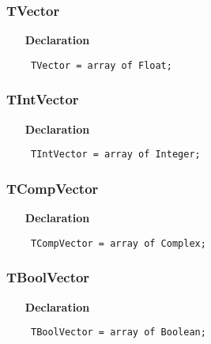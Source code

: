 \documentclass[12pt,a4paper,oneside]{report}
\newcommand{\declarationitem}[1]{\textbf{#1}}
\newcommand{\code}[1]{\texttt{#1}}
\begin{document}
\subsubsection{TVector}
\label{utypes-TVector}
\begin{itemize}\item[\declarationitem{Declaration}\hfill]
	\begin{flushleft}
		\code{
			TVector     = array of Float;}
		
	\end{flushleft}
	
\end{itemize}
\subsubsection{TIntVector}
\label{utypes-TIntVector}
\begin{itemize}\item[\declarationitem{Declaration}\hfill]
	\begin{flushleft}
		\code{
			TIntVector  = array of Integer;}
		
	\end{flushleft}
	
\end{itemize}
\subsubsection{TCompVector}
\label{utypes-TCompVector}
\begin{itemize}\item[\declarationitem{Declaration}\hfill]
	\begin{flushleft}
		\code{
			TCompVector = array of Complex;}
		
	\end{flushleft}
	
\end{itemize}
\subsubsection{TBoolVector}
\label{utypes-TBoolVector}
\begin{itemize}\item[\declarationitem{Declaration}\hfill]
	\begin{flushleft}
		\code{
			TBoolVector = array of Boolean;}
		
	\end{flushleft}
	
\end{itemize}
\end{document}
